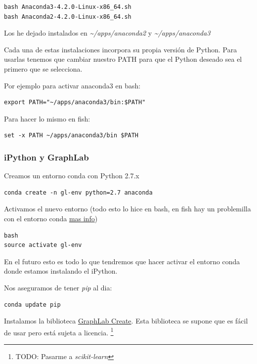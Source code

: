 \documentclass[12pt,spanish,]{article}
\begin{document}
\begin{verbatim}
bash Anaconda3-4.2.0-Linux-x86_64.sh
bash Anaconda2-4.2.0-Linux-x86_64.sh
\end{verbatim}

Los he dejado instalados en \emph{\textasciitilde{}/apps/anaconda2} y
\emph{\textasciitilde{}/apps/anaconda3}

Cada una de estas instalaciones incorpora su propia versión de Python.
Para usarlas tenemos que cambiar nuestro PATH para que el Python deseado
sea el primero que se selecciona.

Por ejemplo para activar anaconda3 en bash:

\begin{verbatim}
export PATH="~/apps/anaconda3/bin:$PATH"
\end{verbatim}

Para hacer lo mismo en fish:

\begin{verbatim}
set -x PATH ~/apps/anaconda3/bin $PATH
\end{verbatim}

\subsubsection{iPython y GraphLab}\label{ipython-y-graphlab}

Creamos un entorno conda con Python 2.7.x

\begin{verbatim}
conda create -n gl-env python=2.7 anaconda
\end{verbatim}

Activamos el nuevo entorno (todo esto lo hice en bash, en fish hay un
problemilla con el entorno conda
\href{https://penandpants.com/2014/02/28/using-conda-environments-and-the-fish-shell/}{mas
info})

\begin{verbatim}
bash
source activate gl-env
\end{verbatim}

En el futuro esto es todo lo que tendremos que hacer activar el entorno
conda donde estamos instalando el iPython.

Nos aseguramos de tener \emph{pip} al dia:

\begin{verbatim}
conda update pip
\end{verbatim}

Instalamos la biblioteca
\href{https://turi.com/products/create/}{GraphLab Create}. Esta
biblioteca se supone que es fácil de usar pero está sujeta a licencia.
\footnote{TODO: Pasarme a \emph{scikit-learn}}
\end{document}
